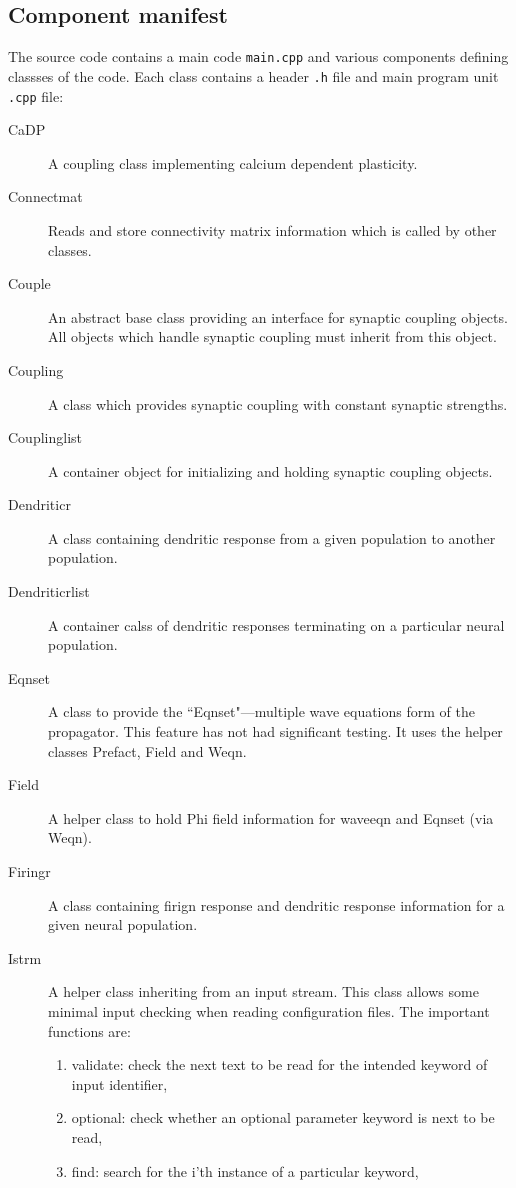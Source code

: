 \documentclass[12pt,a4paper]{article}
\newcommand{\type}[1]{ {\small\small\tt #1} }
\begin{document}
\subsection{Component manifest}

The source code contains a main code \type{main.cpp} and various components defining classses of the code. Each class contains a header \type{.h} file and main program unit \type{.cpp} file:

\begin{description}
\item[CaDP] A coupling class implementing calcium dependent plasticity.
\item[Connectmat] Reads and store connectivity matrix information which is called by other classes.
\item[Couple] An abstract base class providing an interface for synaptic coupling objects. All objects which handle synaptic coupling must inherit from this object.
\item[Coupling] A class which provides synaptic coupling with constant synaptic strengths.
\item[Couplinglist] A container object for initializing and holding synaptic coupling objects.
\item[Dendriticr] A class containing dendritic response from a given population to another population.
\item[Dendriticrlist] A container calss of dendritic responses terminating on a particular neural population.
\item[Eqnset] A class to provide the ``Eqnset"---multiple wave equations form of the propagator. This feature has not had significant testing. It uses the helper classes Prefact, Field and Weqn.
\item[Field] A helper class to hold Phi field information for waveeqn and Eqnset (via Weqn).
\item[Firingr] A class containing firign response and dendritic response information for a given neural population.
\item[Istrm] A helper class inheriting from an input stream. This class allows some minimal input checking when reading configuration files. The important functions are:
	\begin{enumerate}
	\item validate: check the next text to be read for the intended keyword of input identifier,
	\item optional: check whether an optional parameter keyword is next to be read,
	\item find: search for the i'th instance of a particular keyword,

\end{enumerate}
\end{description}
\end{document}
